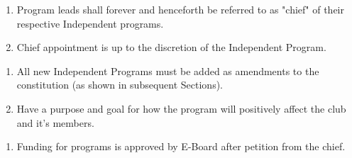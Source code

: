 


\begin{enumerate}
  \item Program leads shall forever and henceforth be referred to as "chief" of
    their respective Independent programs.
  \item Chief appointment is up to the discretion of the Independent Program.
\end{enumerate}


\begin{enumerate}
  \item All new Independent Programs must be added as amendments to the
    constitution (as shown in subsequent Sections).
  \item Have a purpose and goal for how the program will positively affect the
    club and it’s members.
\end{enumerate}


\begin{enumerate}
  \item Funding for programs is approved by E-Board after petition from the
    chief.
\end{enumerate}



